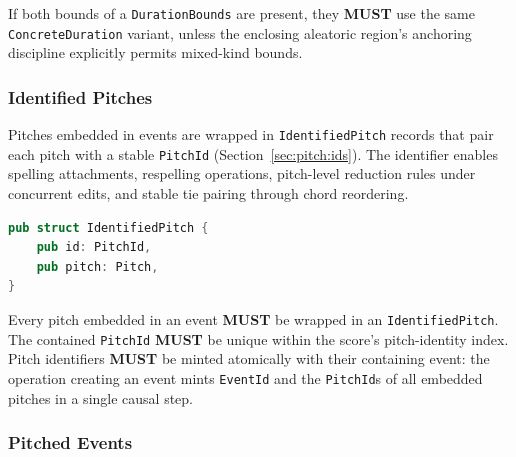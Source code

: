 \documentclass[11pt,letterpaper]{report}
\newcounter{requirement}[chapter]
\newcommand{\MUST}{\textbf{MUST}}
\begin{document}
\begin{requirement}
  \label{req:graph:duration-bound-kinds}
  If both bounds of a \texttt{DurationBounds} are present, they
  \MUST{} use the same \texttt{ConcreteDuration} variant, unless the
  enclosing aleatoric region's anchoring discipline explicitly
  permits mixed-kind bounds.
\end{requirement}

\subsubsection{Identified Pitches}
\label{sec:graph:identified-pitch}

Pitches embedded in events are wrapped in \texttt{IdentifiedPitch}
records that pair each pitch with a stable \texttt{PitchId}
(Section~\ref{sec:pitch:ids}). The identifier enables spelling
attachments, respelling operations, pitch-level reduction rules
under concurrent edits, and stable tie pairing through chord
reordering.

\begin{lstlisting}[language=Rust]
pub struct IdentifiedPitch {
    pub id: PitchId,
    pub pitch: Pitch,
}
\end{lstlisting}

\begin{requirement}
  \label{req:graph:identified-pitch-ownership}
  Every pitch embedded in an event \MUST{} be wrapped in an
  \texttt{IdentifiedPitch}. The contained \texttt{PitchId} \MUST{} be
  unique within the score's pitch-identity index. Pitch identifiers
  \MUST{} be minted atomically with their containing event: the
  operation creating an event mints \texttt{EventId} and the
  \texttt{PitchId}s of all embedded pitches in a single causal step.
\end{requirement}

\subsubsection{Pitched Events}
\end{document}
